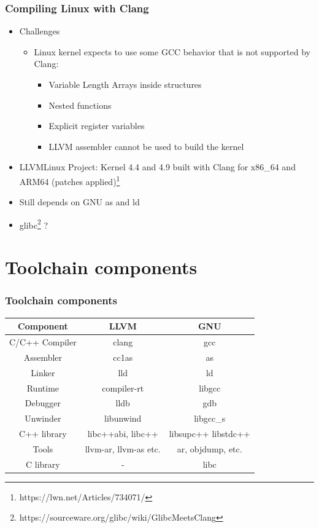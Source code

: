 \documentclass{smilebeamer}
\begin{document}
\begin{frame}
\frametitle{Compiling Linux with Clang}
\begin{itemize}
  \item Challenges
  \begin{itemize}
    \item Linux kernel expects to use some GCC behavior that is not supported by Clang:
    \begin{itemize}
      \item Variable Length Arrays inside structures
      \item Nested functions
      \item Explicit register variables
      \item LLVM assembler cannot be used to build the kernel
    \end{itemize}
  \end{itemize}
  \item LLVMLinux Project: Kernel 4.4 and 4.9 built with Clang for x86\_64 and ARM64
  (patches applied)\footnote{https://lwn.net/Articles/734071/}
  \item Still depends on GNU {\selectfont as} and {\selectfont ld}
  \item glibc\footnote{https://sourceware.org/glibc/wiki/GlibcMeetsClang} ?
\end{itemize}
\end{frame}

\section{Toolchain components}
\begin{frame}
\frametitle{Toolchain components}
\centering
  \begin{tabular}{c|c|c}
  \textbf{Component} & \textbf{LLVM} & \textbf{GNU} \\
  \hline
  C/C++ Compiler & clang & gcc \\
  Assembler & cc1as & as \\
  Linker & lld & ld \\
  Runtime & compiler-rt & libgcc \\
  Debugger & lldb & gdb \\
  Unwinder & libunwind & libgcc\_s \\
  C++ library & libc++abi, libc++ & libsupc++ libstdc++ \\
  Tools & llvm-ar, llvm-as etc. & ar, objdump, etc. \\
  C library & - & libc \\
  \end{tabular}
\end{frame}
\end{document}
